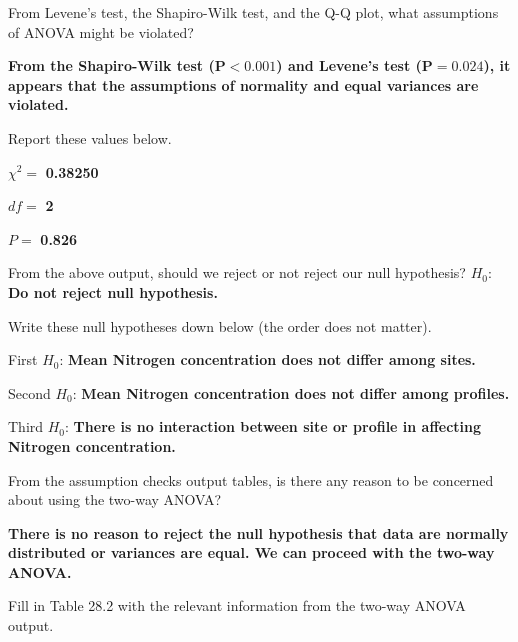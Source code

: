 \documentclass[
  openany]{krantz}
\begin{document}
From Levene's test, the Shapiro-Wilk test, and the Q-Q plot, what assumptions of ANOVA might be violated?

\textbf{From the Shapiro-Wilk test (\(\mathbf{P < 0.001}\)) and Levene's test (\(\mathbf{P = 0.024}\)), it appears that the assumptions of normality and equal variances are violated.}

Report these values below.

\(\chi^{2} =\) \textbf{0.38250}

\(df =\) \textbf{2}

\(P =\) \textbf{0.826}

From the above output, should we reject or not reject our null hypothesis? \(H_{0}\): \textbf{Do not reject null hypothesis.}

Write these null hypotheses down below (the order does not matter).

First \(H_{0}\): \textbf{Mean Nitrogen concentration does not differ among sites.}

Second \(H_{0}\): \textbf{Mean Nitrogen concentration does not differ among profiles.}

Third \(H_{0}\): \textbf{There is no interaction between site or profile in affecting Nitrogen concentration.}

From the assumption checks output tables, is there any reason to be concerned about using the two-way ANOVA?

\textbf{There is no reason to reject the null hypothesis that data are normally distributed or variances are equal. We can proceed with the two-way ANOVA.}

Fill in Table 28.2 with the relevant information from the two-way ANOVA output.
\end{document}
